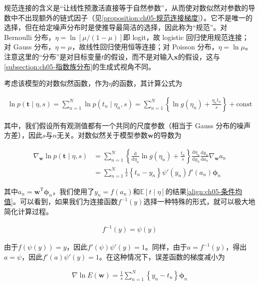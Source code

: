 \documentclass[../../main.tex]{subfiles}
\begin{document}
\begin{remark}
规范连接的含义是“让线性预激活直接等于自然参数”，从而使对数似然对参数的导数中不出现额外的链式因子（见\cref{proposition:ch05-规范连接梯度}）。它不是唯一的选择，但在给定噪声分布时是使推导最简洁的选择，因此称为“规范”。对 Bernoulli 分布，$\eta=\ln[\mu/(1-\mu)]$即 logit，故 logistic 回归使用规范连接；对 Gauss 分布，$\eta=\mu$，故线性回归使用恒等连接；对 Poisson 分布，$\eta=\ln\mu$。注意这里的“分布”是对目标变量$t$的假设，而不是对输入$\boldsymbol{x}$的假设，这与\cref{subsection:ch05-指数族分布}的生成式视角不同。
\end{remark}

考虑该模型的对数似然函数，作为$\eta$的函数，其计算公式为

\begin{align}
  \ln p(\boldsymbol{t}\mid\eta,s)=\sum_{n=1}^{N}\ln p(t_n\mid\eta_n,s)=\sum_{n=1}^{N}\left\{\ln g(\eta_n)+\frac{\eta_nt_n}{s}\right\}+\text{const}
  \label{align:ch05-对数似然}
\end{align}

其中，我们假设所有观测值都有一个共同的尺度参数（相当于 Gauss 分布的噪声方差），因此$s$与$n$无关。对数似然关于模型参数$\boldsymbol{w}$的导数为

\begin{align}
  \nabla_{\boldsymbol{w}}\ln p(\boldsymbol{t}\mid\eta,s)&=\sum_{n=1}^{N}\left\{\frac{\mathrm{d}}{\mathrm{d}\eta_n}\ln g(\eta_n)+\frac{t_n}{s}\right\}\frac{\mathrm{d}\eta_n}{\mathrm{d}y_n}\frac{\mathrm{d}y_n}{\mathrm{d}a_n}\nabla_{\boldsymbol{w}}a_n\nonumber\\
  &=\sum_{n=1}^{N}\frac{1}{s}\left\{t_n-y_n\right\}\psi'(y_n)f'(a_n)\boldsymbol{\phi}_n
  \label{align:ch05-梯度链式}
\end{align}

其中$a_n=\boldsymbol{w}^{\mathsf{T}}\boldsymbol{\phi}_n$，我们使用了$y_n=f(a_n)$和$\mathbb{E}[t\mid\eta]$的结果\eqref{align:ch05-条件均值}。可以看到，如果我们为连接函数$f^{-1}(y)$选择一种特殊的形式，就可以极大地简化计算过程。

\begin{align}
  f^{-1}(y)=\psi(y)
  \label{align:ch05-规范连接条件}
\end{align}

由于$f(\psi(y))=y$，因此$f'(\psi)\psi'(y)=1$。同样，由于$a=f^{-1}(y)$，得出$a=\psi$，因此$f'(a)\psi'(y)=1$。在这种情况下，误差函数的梯度减小为

\begin{align}
  \nabla\ln E(\boldsymbol{w})=\frac{1}{s}\sum_{n=1}^{N}\left\{y_n-t_n\right\}\boldsymbol{\phi}_n
  \label{align:ch05-规范连接梯度}
\end{align}
\end{document}
